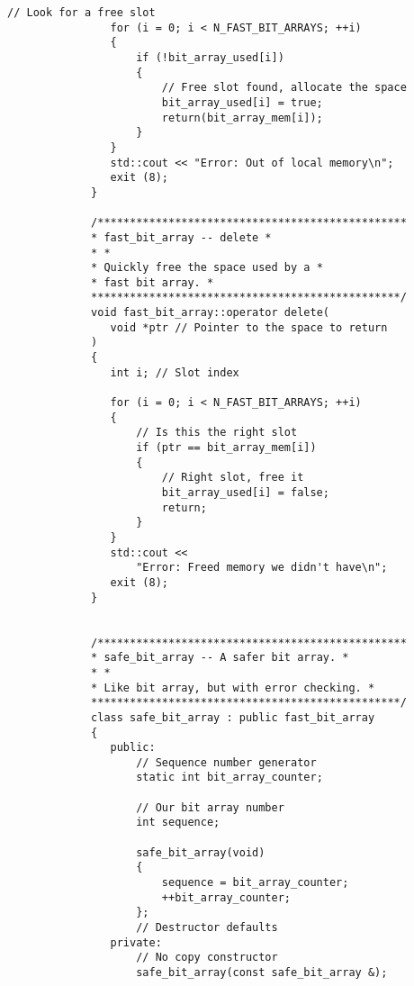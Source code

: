 \begin{LTR}
\begin{lstlisting}[style=C++Style]
             	// Look for a free slot
             	for (i = 0; i < N_FAST_BIT_ARRAYS; ++i)
             	{
             		if (!bit_array_used[i])
             		{
             			// Free slot found, allocate the space
             			bit_array_used[i] = true;
             			return(bit_array_mem[i]);
             		}
             	}
             	std::cout << "Error: Out of local memory\n";
             	exit (8);
             }

             /************************************************
             * fast_bit_array -- delete *
             * *
             * Quickly free the space used by a *
             * fast bit array. *
             ************************************************/
             void fast_bit_array::operator delete(
             	void *ptr // Pointer to the space to return
             )
             {
             	int i; // Slot index

             	for (i = 0; i < N_FAST_BIT_ARRAYS; ++i)
             	{
             		// Is this the right slot
             		if (ptr == bit_array_mem[i])
             		{
             			// Right slot, free it
             			bit_array_used[i] = false;
             			return;
             		}
             	}
             	std::cout <<
             		"Error: Freed memory we didn't have\n";
             	exit (8);
             }


             /************************************************
             * safe_bit_array -- A safer bit array. *
             * *
             * Like bit array, but with error checking. *
             ************************************************/
             class safe_bit_array : public fast_bit_array
             {
             	public:
             		// Sequence number generator
             		static int bit_array_counter;

             		// Our bit array number
             		int sequence;

             		safe_bit_array(void)
             		{
             			sequence = bit_array_counter;
             			++bit_array_counter;
             		};
             		// Destructor defaults
             	private:
             		// No copy constructor
             		safe_bit_array(const safe_bit_array &);


\end{lstlisting}
\end{LTR}
